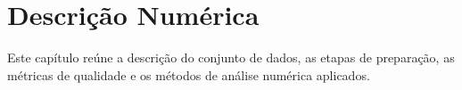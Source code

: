 \documentclass[12pt]{article} %
\begin{document}
	
	\newpage
	\chapter{Descrição Numérica}\label{chap:descricao_numerica}

		Este capítulo reúne a descrição do conjunto de dados, as etapas de preparação, as métricas de qualidade e os métodos de análise numérica aplicados.
	
		
		
		
		
%		
		
		
		
	
				
\end{document}
